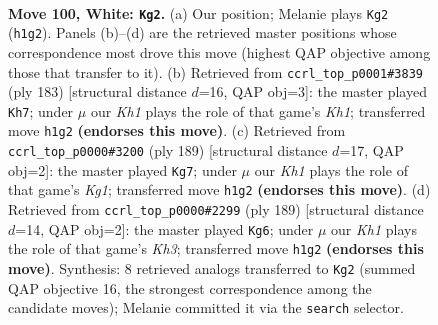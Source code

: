 \documentclass[11pt]{article}
\begin{document}
\clearpage

\begin{figure}[p]\centering
\begin{subfigure}{0.46\textwidth}\centering
\resizebox{\linewidth}{!}{%
\newchessgame
\chessboard[
  setfen={1k6/4R3/8/8/p6r/P5n1/7p/7K w - - 26 100},
  showmover=false,
  pgfstyle=straightmove, color=movearrow, markmove={h1-g2}
]}
\caption{}
\end{subfigure}\hfill
\begin{subfigure}{0.46\textwidth}\centering
\resizebox{\linewidth}{!}{%
\newchessgame
\chessboard[
  setfen={7k/8/P3R2P/8/8/r4p2/5K2/8 b - - 16 92},
  showmover=false,
  pgfstyle=straightmove, color=movearrow, markmove={h8-h7}
]}
\caption{}
\end{subfigure}
\\[4pt]
\begin{subfigure}{0.46\textwidth}\centering
\resizebox{\linewidth}{!}{%
\newchessgame
\chessboard[
  setfen={6k1/r7/3K4/6Pp/5R1P/8/8/8 b - - 18 95},
  showmover=false,
  pgfstyle=straightmove, color=movearrow, markmove={g8-g7}
]}
\caption{}
\end{subfigure}\hfill
\begin{subfigure}{0.46\textwidth}\centering
\resizebox{\linewidth}{!}{%
\newchessgame
\chessboard[
  setfen={8/8/7k/5R2/6p1/6P1/r4P2/2K5 b - - 95 95},
  showmover=false,
  pgfstyle=straightmove, color=movearrow, markmove={h6-g6}
]}
\caption{}
\end{subfigure}
\caption{\textbf{Move 100, White: \texttt{Kg2}.} (a) Our position; Melanie plays \texttt{Kg2} (\texttt{h1g2}). Panels (b)--(d) are the retrieved master positions whose correspondence most drove this move (highest QAP objective among those that transfer to it). (b) Retrieved from \texttt{ccrl\_top\_p0001\#3839} (ply 183) [structural distance $d$=16, QAP obj=3]: the master played \texttt{Kh7}; under $\mu$ our \emph{Kh1} plays the role of that game's \emph{Kh1}; transferred move \texttt{h1g2} \textbf{(endorses this move)}. (c) Retrieved from \texttt{ccrl\_top\_p0000\#3200} (ply 189) [structural distance $d$=17, QAP obj=2]: the master played \texttt{Kg7}; under $\mu$ our \emph{Kh1} plays the role of that game's \emph{Kg1}; transferred move \texttt{h1g2} \textbf{(endorses this move)}. (d) Retrieved from \texttt{ccrl\_top\_p0000\#2299} (ply 189) [structural distance $d$=14, QAP obj=2]: the master played \texttt{Kg6}; under $\mu$ our \emph{Kh1} plays the role of that game's \emph{Kh3}; transferred move \texttt{h1g2} \textbf{(endorses this move)}. Synthesis: 8 retrieved analogs transferred to \texttt{Kg2} (summed QAP objective 16, the strongest correspondence among the candidate moves); Melanie committed it via the \texttt{search} selector.}
\label{fig:thought-m198}
\end{figure}
\end{document}
